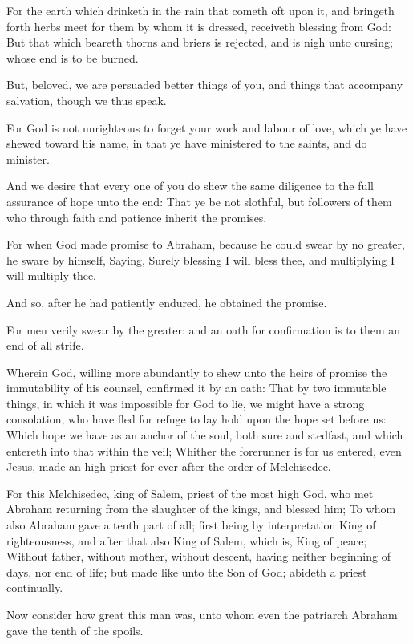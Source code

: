 \Verse For the earth which drinketh in the rain that cometh oft upon it, and bringeth forth herbs meet for them by whom it is dressed, receiveth blessing from God: \Verse But that which beareth thorns and briers is rejected, and is nigh unto cursing; whose end is to be burned.

\Verse But, beloved, we are persuaded better things of you, and things that accompany salvation, though we thus speak.

\Verse For God is not unrighteous to forget your work and labour of love, which ye have shewed toward his name, in that ye have ministered to the saints, and do minister.

\Verse And we desire that every one of you do shew the same diligence to the full assurance of hope unto the end: \Verse That ye be not slothful, but followers of them who through faith and patience inherit the promises.

\Verse For when God made promise to Abraham, because he could swear by no greater, he sware by himself, \Verse Saying, Surely blessing I will bless thee, and multiplying I will multiply thee.

\Verse And so, after he had patiently endured, he obtained the promise.

\Verse For men verily swear by the greater: and an oath for confirmation is to them an end of all strife.

\Verse Wherein God, willing more abundantly to shew unto the heirs of promise the immutability of his counsel, confirmed it by an oath: \Verse That by two immutable things, in which it was impossible for God to lie, we might have a strong consolation, who have fled for refuge to lay hold upon the hope set before us: \Verse Which hope we have as an anchor of the soul, both sure and stedfast, and which entereth into that within the veil; \Verse Whither the forerunner is for us entered, even Jesus, made an high priest for ever after the order of Melchisedec.


\Chapter
\Verse For this Melchisedec, king of Salem, priest of the most high God, who met Abraham returning from the slaughter of the kings, and blessed him; \Verse To whom also Abraham gave a tenth part of all; first being by interpretation King of righteousness, and after that also King of Salem, which is, King of peace; \Verse Without father, without mother, without descent, having neither beginning of days, nor end of life; but made like unto the Son of God; abideth a priest continually.

\Verse Now consider how great this man was, unto whom even the patriarch Abraham gave the tenth of the spoils.

